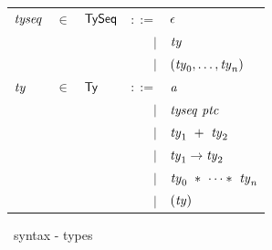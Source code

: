 \documentclass[final]{article}
\begin{document}
\begin{figure}[t]
\begin{small}
\begin{center}
  \begin{tabular}{lllrl}
    $\mathit{tyseq}$
    & $\in$
    & $\mathsf{TySeq}$
    & $::=$
    & $\epsilon$
    \\
    &&& $\mid$
    & $\mathit{ty}$
    \\
    &&& $\mid$
    & $(\mathit{ty}_0,\dots,\mathit{ty}_n)$
    \\

    $\mathit{ty}$
    & $\in$
    & $\mathsf{Ty}$
    & $::=$
    & $\mathit{a}$
    \\
    &&& $\mid$
    & $\mathit{tyseq}\ \mathit{ptc}$
    \\
    &&& $\mid$
    & $\mathit{ty}_1\ +\ \mathit{ty}_2$
    \\
    &&& $\mid$
    & $\mathit{ty}_1\rightarrow\mathit{ty}_2$
    \\
    &&& $\mid$
    & $\mathit{ty}_0\ *\ \cdots *\ \mathit{ty}_n$
    \\
    &&& $\mid$
    & $(\mathit{ty})$
  \end{tabular}
\end{center}
\caption{\eml\ syntax - types}
\label{fig:esharp-syntax-types}
\end{small}
\end{figure}
\end{document}
